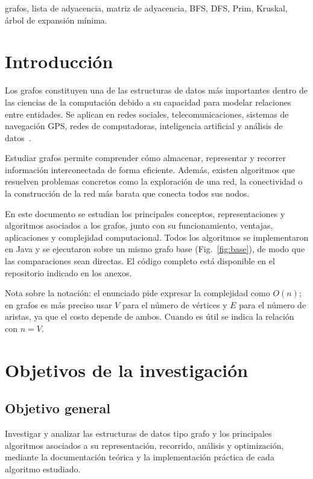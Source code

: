 \documentclass[conference]{IEEEtran}
\begin{document}
\vspace{2mm}
\begin{IEEEkeywords}
grafos, lista de adyacencia, matriz de adyacencia, BFS, DFS, Prim, Kruskal, árbol de expansión mínima.
\end{IEEEkeywords}

\section{Introducción}
Los grafos constituyen una de las estructuras de datos más importantes dentro de las ciencias de la computación debido a su capacidad para modelar relaciones entre entidades. Se aplican en redes sociales, telecomunicaciones, sistemas de navegación GPS, redes de computadoras, inteligencia artificial y análisis de datos~\cite{cormen,rosen}.

Estudiar grafos permite comprender cómo almacenar, representar y recorrer información interconectada de forma eficiente. Además, existen algoritmos que resuelven problemas concretos como la exploración de una red, la conectividad o la construcción de la red más barata que conecta todos sus nodos.

En este documento se estudian los principales conceptos, representaciones y algoritmos asociados a los grafos, junto con su funcionamiento, ventajas, aplicaciones y complejidad computacional. Todos los algoritmos se implementaron en Java y se ejecutaron sobre un mismo grafo base (Fig.~\ref{fig:base}), de modo que las comparaciones sean directas. El código completo está disponible en el repositorio indicado en los anexos.

Nota sobre la notación: el enunciado pide expresar la complejidad como $O(n)$; en grafos es más preciso usar $V$ para el número de vértices y $E$ para el número de aristas, ya que el costo depende de ambos. Cuando es útil se indica la relación con $n=V$.

\section{Objetivos de la investigación}
\subsection{Objetivo general}
Investigar y analizar las estructuras de datos tipo grafo y los principales algoritmos asociados a su representación, recorrido, análisis y optimización, mediante la documentación teórica y la implementación práctica de cada algoritmo estudiado.
\end{document}
